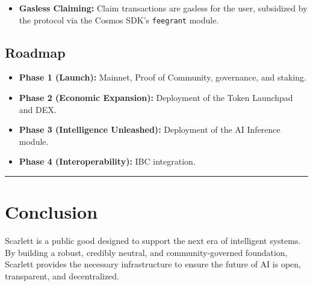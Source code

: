 \documentclass[10pt]{article}
\begin{document}
\begin{itemize}[leftmargin=*, itemsep=2pt]
    \item \textbf{Gasless Claiming:} Claim transactions are gasless for the user, subsidized by the protocol via the Cosmos SDK's \texttt{feegrant} module.
\end{itemize}

\subsection{Roadmap}
\begin{itemize}[leftmargin=*, itemsep=2pt]
    \item \textbf{Phase 1 (Launch):} Mainnet, Proof of Community, governance, and staking.
    \item \textbf{Phase 2 (Economic Expansion):} Deployment of the Token Launchpad and DEX.
    \item \textbf{Phase 3 (Intelligence Unleashed):} Deployment of the AI Inference module.
    \item \textbf{Phase 4 (Interoperability):} IBC integration.
\end{itemize}
\vspace{1em}
\hrule
\newpage
\section{Conclusion}
Scarlett is a public good designed to support the next era of intelligent systems. By building a robust, credibly neutral, and community-governed foundation, Scarlett provides the necessary infrastructure to ensure the future of AI is open, transparent, and decentralized.
\end{document}
